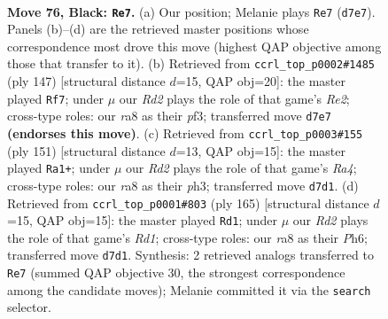 \documentclass[11pt]{article}
\begin{document}
\clearpage

\begin{figure}[p]\centering
\begin{subfigure}{0.46\textwidth}\centering
\resizebox{\linewidth}{!}{%
\newchessgame
\chessboard[
  setfen={R7/3r1p2/2R1p3/6k1/P3P3/5P2/6K1/8 b - - 44 76},
  showmover=false,
  pgfstyle=straightmove, color=movearrow, markmove={d7-e7}
]}
\caption{}
\end{subfigure}\hfill
\begin{subfigure}{0.46\textwidth}\centering
\resizebox{\linewidth}{!}{%
\newchessgame
\chessboard[
  setfen={8/4r1k1/3R1p2/4p2P/6P1/5PK1/8/8 b - - 50 74},
  showmover=false,
  pgfstyle=straightmove, color=movearrow, markmove={e7-f7}
]}
\caption{}
\end{subfigure}
\\[4pt]
\begin{subfigure}{0.46\textwidth}\centering
\resizebox{\linewidth}{!}{%
\newchessgame
\chessboard[
  setfen={8/8/8/r3k1p1/2R2p2/5P1P/6P1/6K1 b - - 65 76},
  showmover=false,
  pgfstyle=straightmove, color=movearrow, markmove={a5-a1}
]}
\caption{}
\end{subfigure}\hfill
\begin{subfigure}{0.46\textwidth}\centering
\resizebox{\linewidth}{!}{%
\newchessgame
\chessboard[
  setfen={3r2k1/2R2p2/5P1p/4P2P/5K2/8/8/8 b - - 53 83},
  showmover=false,
  pgfstyle=straightmove, color=movearrow, markmove={d8-d1}
]}
\caption{}
\end{subfigure}
\caption{\textbf{Move 76, Black: \texttt{Re7}.} (a) Our position; Melanie plays \texttt{Re7} (\texttt{d7e7}). Panels (b)--(d) are the retrieved master positions whose correspondence most drove this move (highest QAP objective among those that transfer to it). (b) Retrieved from \texttt{ccrl\_top\_p0002\#1485} (ply 147) [structural distance $d$=15, QAP obj=20]: the master played \texttt{Rf7}; under $\mu$ our \emph{Rd2} plays the role of that game's \emph{Re2}; cross-type roles: our \emph{r}a8 as their \emph{p}f3; transferred move \texttt{d7e7} \textbf{(endorses this move)}. (c) Retrieved from \texttt{ccrl\_top\_p0003\#155} (ply 151) [structural distance $d$=13, QAP obj=15]: the master played \texttt{Ra1+}; under $\mu$ our \emph{Rd2} plays the role of that game's \emph{Ra4}; cross-type roles: our \emph{r}a8 as their \emph{p}h3; transferred move \texttt{d7d1}. (d) Retrieved from \texttt{ccrl\_top\_p0001\#803} (ply 165) [structural distance $d$=15, QAP obj=15]: the master played \texttt{Rd1}; under $\mu$ our \emph{Rd2} plays the role of that game's \emph{Rd1}; cross-type roles: our \emph{r}a8 as their \emph{P}h6; transferred move \texttt{d7d1}. Synthesis: 2 retrieved analogs transferred to \texttt{Re7} (summed QAP objective 30, the strongest correspondence among the candidate moves); Melanie committed it via the \texttt{search} selector.}
\label{fig:thought-m151}
\end{figure}
\end{document}
